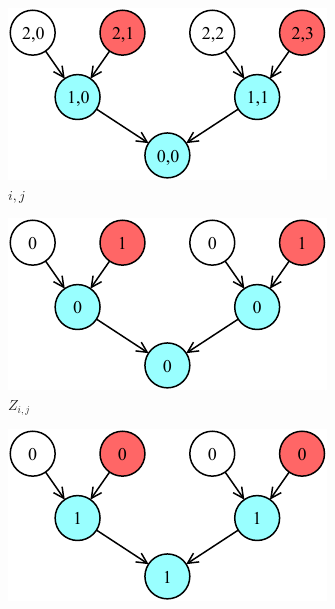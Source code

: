 \documentclass[letterpaper,10pt]{article}
\begin{document}
\begin{figure}[hbtp]
    \centering
    \begin{subfigure}[b]{0.30\textwidth}
        \includegraphics[width=\textwidth]{i.pdf}
        \caption{$i,j$}
        \label{subfig:i}
    \end{subfigure}
    \hspace{0.01\textwidth}
    \begin{subfigure}[b]{0.30\textwidth}
        \includegraphics[width=\textwidth]{Z.pdf}
        \caption{$Z_{i,j}$}
        \label{subfig:ci}
    \end{subfigure}
    \hspace{0.01\textwidth}
    \begin{subfigure}[b]{0.30\textwidth}
        \includegraphics[width=\textwidth]{N.pdf}

\end{subfigure}
\end{figure}
\end{document}
